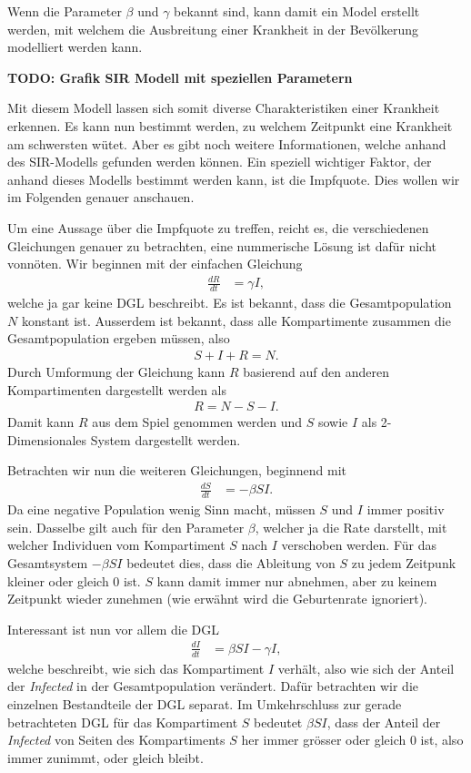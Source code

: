 \begin{refsection}
Wenn die Parameter $\beta$ und $\gamma$ bekannt sind, kann damit ein Model erstellt werden, mit welchem die Ausbreitung einer Krankheit in der Bevölkerung modelliert werden kann.

\textbf{TODO: Grafik SIR Modell mit speziellen Parametern}

Mit diesem Modell lassen sich somit diverse Charakteristiken einer Krankheit erkennen. 
Es kann nun bestimmt werden, zu welchem Zeitpunkt eine Krankheit am schwersten wütet. 
Aber es gibt noch weitere Informationen, welche anhand des SIR-Modells gefunden werden können.
Ein speziell wichtiger Faktor, der anhand dieses Modells bestimmt werden kann, ist die Impfquote.
Dies wollen wir im Folgenden genauer anschauen.

Um eine Aussage über die Impfquote zu treffen, reicht es, die verschiedenen Gleichungen genauer zu betrachten, eine nummerische Lösung ist dafür nicht vonnöten.
Wir beginnen mit der einfachen Gleichung
\begin{align*}
  \frac{dR}{dt} &= \gamma I,
\end{align*}
welche ja gar keine DGL beschreibt. 
Es ist bekannt, dass die Gesamtpopulation $N$ konstant ist. 
Ausserdem ist bekannt, dass alle Kompartimente zusammen die Gesamtpopulation ergeben müssen, also
\begin{align*}
  S + I + R = N.
\end{align*}
Durch Umformung der Gleichung kann $R$ basierend auf den anderen Kompartimenten dargestellt werden als
\begin{align*}
  R = N - S - I.
\end{align*}
Damit kann $R$ aus dem Spiel genommen werden und $S$ sowie $I$ als 2-Dimensionales System dargestellt werden.

Betrachten wir nun die weiteren Gleichungen, beginnend mit 
\begin{align*}
  \frac{dS}{dt} & = -\beta S I.
\end{align*}
Da eine negative Population wenig Sinn macht, müssen $S$ und $I$ immer positiv sein. 
Dasselbe gilt auch für den Parameter $\beta$, welcher ja die Rate darstellt, mit welcher Individuen vom Kompartiment $S$ nach $I$ verschoben werden.
Für das Gesamtsystem $-\beta S I$ bedeutet dies, dass die Ableitung von $S$ zu jedem Zeitpunk kleiner oder gleich 0 ist. $S$ kann damit immer nur abnehmen, aber zu keinem Zeitpunkt wieder zunehmen (wie erwähnt wird die Geburtenrate ignoriert).

Interessant ist nun vor allem die DGL
\begin{align*}
  \frac{dI}{dt} & = \beta S I - \gamma I,
\end{align*}
welche beschreibt, wie sich das Kompartiment $I$ verhält, also wie sich der Anteil der \emph{Infected} in der Gesamtpopulation verändert.
Dafür betrachten wir die einzelnen Bestandteile der DGL separat. 
Im Umkehrschluss zur gerade betrachteten DGL für das Kompartiment $S$ bedeutet $\beta S I$, dass der Anteil der \emph{Infected} von Seiten des Kompartiments $S$ her immer grösser oder gleich 0 ist, also immer zunimmt, oder gleich bleibt.


\end{refsection}
